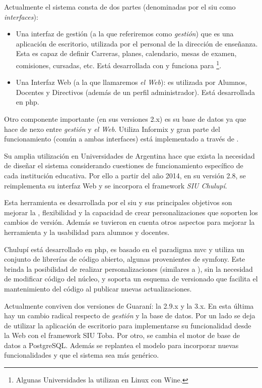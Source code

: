 Actualmente el sistema consta de dos partes (denominadas por el \gls{siu} como \textit{interfaces}):
\begin{itemize}
\item Una interfaz de gestión (a la que referiremos como \textit{gestión}) que es una aplicación de escritorio, utilizada por el personal de la dirección de enseñanza. Esta es capaz de definir Carreras, planes, calendario, mesas de examen, comisiones, cursadas, etc. Está desarrollada con  y funciona para \footnote{Algunas Universidades la utilizan en Linux con Wine.}.
\item Una Interfaz Web (a la que llamaremos \textit{el Web}): es utilizada por Alumnos, Docentes y Directivos (además de un perfil administrador). Está desarrollada en \gls{php}. 
\end{itemize}

Otro componente importante (en sus versiones 2.x) es su base de datos ya que hace de nexo entre \textit{gestión} y \textit{el Web}. Utiliza Informix y gran parte del funcionamiento (común a ambas interfaces) está implementado a través de .

Su amplia utilización en Universidades de Argentina hace que exista la necesidad de diseñar el sistema considerando cuestiones de funcionamiento específico de cada institución educativa. Por ello a partir del año 2014, en su versión 2.8, se reimplementa su interfaz Web y se incorpora el \gls{framework} \textit{SIU Chulupí}.

Esta herramienta es desarrollada por el \gls{siu} y sus principales objetivos son mejorar la , flexibilidad y la capacidad de crear personalizaciones que soporten los cambios de versión. Además se tuvieron en cuenta otros aspectos para mejorar la herramienta y la usabilidad para alumnos y docentes.

Chulupí está desarrollado en \gls{php}, es basado en el paradigma \gls{mvc} y utiliza un conjunto de librerías de código abierto, algunas provenientes de \gls{symfony}. Este brinda la posibilidad de realizar personalizaciones (similares a ), sin la necesidad de modificar código del núcleo, y soporta un esquema de versionado que facilita el mantenimiento del código al publicar nuevas actualizaciones\cite{siu2017chulupi}.

Actualmente conviven dos versiones de Guaraní: la 2.9.x y la 3.x. En esta última hay un cambio radical respecto de \textit{gestión} y la base de datos. Por un lado se deja de utilizar la aplicación de escritorio para implementarse su funcionalidad desde la Web con el \gls{framework} SIU Toba. Por otro, se cambia el motor de base de datos a PostgreSQL. Además se replantea el modelo para incorporar nuevas funcionalidades y que el sistema sea más genérico.

